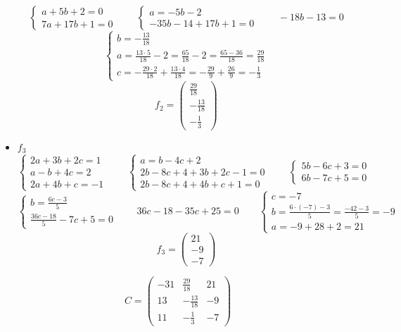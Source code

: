 \begin{itemize}
$$\begin{cases}
    	a + 5b + 2 = 0 \\
        7a + 17b + 1 = 0
    \end{cases} \qquad
    \begin{cases}
    	a = -5b - 2 \\
        -35b - 14 + 17b + 1 = 0
    \end{cases} \qquad -18b - 13 = 0 $$
    $$
    \begin{cases}
        b = -\frac{13}{18} \\
        a = \frac{13 \cdot 5}{18} - 2 = \frac{65}{18} - 2 = \frac{65 - 36}{18} = \frac{29}{18} \\
        c = -\frac{29 \cdot 2}{18} + \frac{13 \cdot 4}{18} = -\frac{29}9 + \frac{26}9 = -\frac13
    \end{cases} $$
    $$ f_2 =
    \begin{pmatrix}
        \frac{29}{18} \\
        -\frac{13}{18} \\
        -\frac13
    \end{pmatrix} $$
    \item $ f_3 $
    $$
    \begin{cases}
    	2a + 3b + 2c = 1 \\
        a - b + 4c = 2 \\
        2a + 4b + c = -1
    \end{cases} \qquad
    \begin{cases}
    	a = b - 4c + 2 \\
        2b - 8c + 4 + 3b + 2c - 1 = 0 \\
        2b - 8c + 4 + 4b + c + 1 = 0
    \end{cases} \qquad
    \begin{cases}
    	5b - 6c + 3 = 0 \\
        6b - 7c + 5 = 0
    \end{cases} $$
    $$
    \begin{cases}
        b = \frac{6c - 3}5 \\
        \frac{36c - 18}5 - 7c + 5 = 0
    \end{cases} \qquad 36c - 18 - 35c + 25 = 0 \qquad
    \begin{cases}
    	c = -7 \\
        b = \frac{6 \cdot (-7) - 3}5 = \frac{-42 - 3}5 = -9 \\
        a = -9 + 28 + 2 = 21
    \end{cases} $$
    $$ f_3 =
    \begin{pmatrix}
    	21 \\
        -9 \\
        -7
    \end{pmatrix} $$
\end{itemize}
$$ C =
\begin{pmatrix}
    -31 & \frac{29}{18} & 21 \\
    13 & -\frac{13}{18} & -9 \\
    11 & -\frac13 & -7
\end{pmatrix} $$

